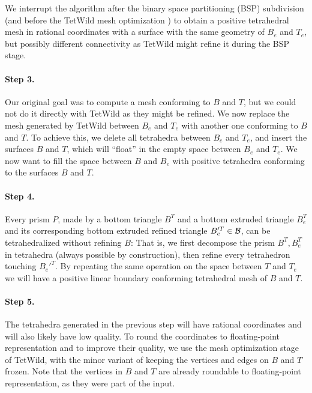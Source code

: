 We interrupt the algorithm after the  binary space partitioning (BSP) subdivision (and before the TetWild mesh optimization \cite[Section 3.2]{hu2018tetrahedral})
to obtain a positive tetrahedral mesh in rational coordinates with a surface with the same geometry of $B_e$ and $T_e$, but possibly different connectivity as TetWild might refine it during the BSP stage.

\paragraph{Step 3.}
Our original goal was to compute a mesh conforming to $B$ and $T$, but we could not do it directly with TetWild as they might be refined. We now replace the mesh generated by TetWild between $B_e$ and $T_e$ with another one conforming to $B$ and $T$. To achieve this, we delete all tetrahedra between $B_e$ and $T_e$, and insert the surfaces $B$ and $T$, which will ``float'' in the empty space between $B_e$ and $T_e$. We now want to fill the space between $B$ and $B_e$ with positive tetrahedra conforming to the surfaces $B$ and $T$. 

\paragraph{Step 4.}
Every prism $P$, made by a bottom triangle $B^T$ and a bottom extruded triangle $B_e^T$ and its corresponding bottom extruded refined triangle $B_e'^T \in \mathcal{B}$, can be tetrahedralized without refining $B$: That is, we first decompose the prism $B^T, B_e^T$ in tetrahedra (always possible by construction), then refine every tetrahedron touching $B_e'^T$. By repeating the same operation on the space between $T$ and $T_e$ we will have a positive linear boundary conforming tetrahedral mesh of $B$ and $T$. 

\paragraph{Step 5.}
The tetrahedra generated in the previous step will have rational coordinates and will also likely have low quality. To round the coordinates to floating-point representation and to improve their quality, we use the mesh optimization stage of TetWild, with the minor variant of keeping the vertices and edges on $B$ and $T$ frozen. Note that the vertices in $B$ and $T$ are already roundable to floating-point representation, as they were part of the input.


